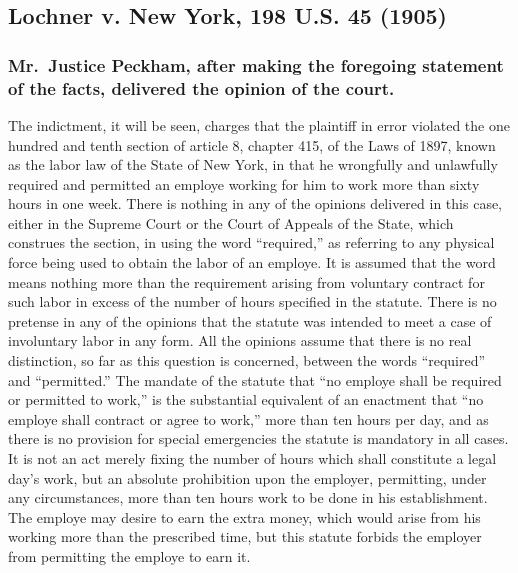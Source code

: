 \documentclass[
  letterpaper,
  11pt,
  DIV=9,
  openright]{scrbook}
\begin{document}
\subsection{Lochner v. New York, 198 U.S. 45
(1905)}\label{lochner-v.-new-york-198-u.s.-45-1905}

\subsubsection{Mr.~Justice Peckham, after making the foregoing statement
of the facts, delivered the opinion of the
court.}\label{mr.-justice-peckham-after-making-the-foregoing-statement-of-the-facts-delivered-the-opinion-of-the-court.}

The indictment, it will be seen, charges that the plaintiff in error
violated the one hundred and tenth section of article 8, chapter 415, of
the Laws of 1897, known as the labor law of the State of New York, in
that he wrongfully and unlawfully required and permitted an employe
working for him to work more than sixty hours in one week. There is
nothing in any of the opinions delivered in this case, either in the
Supreme Court or the Court of Appeals of the State, which construes the
section, in using the word ``required,'' as referring to any physical
force being used to obtain the labor of an employe. It is assumed that
the word means nothing more than the requirement arising from voluntary
contract for such labor in excess of the number of hours specified in
the statute. There is no pretense in any of the opinions that the
statute was intended to meet a case of involuntary labor in any form.
All the opinions assume that there is no real distinction, so far as
this question is concerned, between the words ``required'' and
``permitted.'' The mandate of the statute that ``no employe shall be
required or permitted to work,'' is the substantial equivalent of an
enactment that ``no employe shall contract or agree to work,'' more than
ten hours per day, and as there is no provision for special emergencies
the statute is mandatory in all cases. It is not an act merely fixing
the number of hours which shall constitute a legal day's work, but an
absolute prohibition upon the employer, permitting, under any
circumstances, more than ten hours work to be done in his establishment.
The employe may desire to earn the extra money, which would arise from
his working more than the prescribed time, but this statute forbids the
employer from permitting the employe to earn it.
\end{document}
